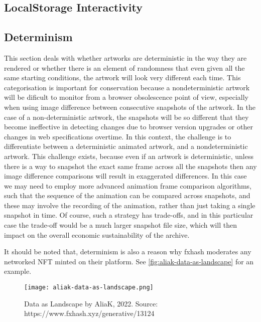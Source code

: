\subsection{LocalStorage Interactivity}


\subsection{Determinism}

This section deals with whether artworks are deterministic in the way they are rendered or whether there is an element of randomness that even given all the same starting conditions, the artwork will look very different each time. This categorisation is important for conservation because a nondeterministic artwork will be dificult to monitor from a browser obsolescence point of view, especially when using image difference between consecutive snapshots of the artwork. In the case of a non-deterministic artwork, the snapshots will be so different that they become ineffective in detecting changes due to browser version upgrades or other changes in web specifications overtime. In this context, the challenge is to differentiate between a deterministic animated artwork, and a nondeterministic artwork. This challenge exists, because even if an artwork is deterministic, unless there is a way to snapshot the exact same frame across all the snapshots then any image difference comparisons will result in exaggerated differences. In this case we may need to employ more advanced animation frame comparison algorithms, such that the sequence of the animation can be compared across snapshots, and these may involve the recording of the animation, rather than just taking a single snapshot in time. Of course, such a strategy has trade-offs, and in this particular case the trade-off would be a much larger snapshot file size, which will then impact on the overall economic sustainability of the archive.

It should be noted that, determinism is also a reason why fxhash moderates any networked NFT minted on their platform. See \autoref{fig:aliak-data-as-landscape} for an example.

\begin{figure}[h]
    \centering
    \captionsetup{justification=centering}
    \texttt{[image: aliak-data-as-landscape.png]}
    \caption[Data as Landscape by AliaK]{Data as Landscape by AliaK, 2022. Source: https://www.fxhash.xyz/generative/13124}
    \label{fig:aliak-data-as-landscape}
\end{figure}




